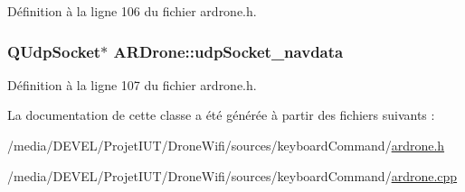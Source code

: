 Définition à la ligne 106 du fichier ardrone.\-h.

\hypertarget{class_a_r_drone_ac4bc7a85d5b0ad4ed7631d37fed1304e}{
\subsubsection[{udp\-Socket\-\_\-navdata}]{\setlength{\rightskip}{0pt plus 5cm}Q\-Udp\-Socket$\ast$ A\-R\-Drone\-::udp\-Socket\-\_\-navdata\hspace{0.3cm}{\ttfamily [private]}}}\label{class_a_r_drone_ac4bc7a85d5b0ad4ed7631d37fed1304e}


Définition à la ligne 107 du fichier ardrone.\-h.



La documentation de cette classe a été générée à partir des fichiers suivants \-:\begin{DoxyCompactItemize}
\item 
/media/\-D\-E\-V\-E\-L/\-Projet\-I\-U\-T/\-Drone\-Wifi/sources/keyboard\-Command/\hyperlink{ardrone_8h}{ardrone.\-h}\item 
/media/\-D\-E\-V\-E\-L/\-Projet\-I\-U\-T/\-Drone\-Wifi/sources/keyboard\-Command/\hyperlink{ardrone_8cpp}{ardrone.\-cpp}\end{DoxyCompactItemize}

